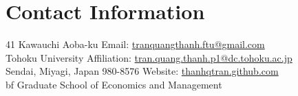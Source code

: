 \section{\sc Contact Information}
41 Kawauchi Aoba-ku      \hfill  Email: \href{mailto:tranquangthanh.ftu@gmail.com}{tranquangthanh.ftu@gmail.com}\\
Tohoku University  	 		\hfill Affiliation: \href{mailto:tran.quang.thanh.p1@dc.tohoku.ac.jp}{tran.quang.thanh.p1@dc.tohoku.ac.jp}\\
Sendai, Miyagi, Japan 980-8576 \hfill Website: \href{https://thanhqtran.github.com}{thanhqtran.github.com} \\
{bf Graduate School of Economics and Management} \hfill 


